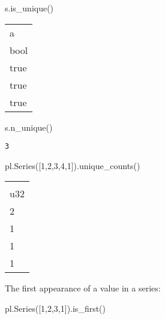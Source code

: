 \documentclass[
  letterpaper,
  DIV=11,
  numbers=noendperiod]{scrartcl}
\newenvironment{Shaded}{\begin{snugshade}}{\end{snugshade}}
\newcommand{\DecValTok}[1]{\textcolor[rgb]{0.68,0.00,0.00}{#1}}
\newcommand{\NormalTok}[1]{\textcolor[rgb]{0.00,0.23,0.31}{#1}}
\begin{document}
\begin{Shaded}
\begin{Highlighting}[]
\NormalTok{s.is\_unique()}
\end{Highlighting}
\end{Shaded}

\begin{longtable}[]{@{}l@{}}
\toprule()
a \\
bool \\
\midrule()
\endhead
true \\
true \\
true \\
\bottomrule()
\end{longtable}

\begin{Shaded}
\begin{Highlighting}[]
\NormalTok{s.n\_unique()}
\end{Highlighting}
\end{Shaded}

\begin{verbatim}
3
\end{verbatim}

\begin{Shaded}
\begin{Highlighting}[]
\NormalTok{pl.Series([}\DecValTok{1}\NormalTok{,}\DecValTok{2}\NormalTok{,}\DecValTok{3}\NormalTok{,}\DecValTok{4}\NormalTok{,}\DecValTok{1}\NormalTok{]).unique\_counts()}
\end{Highlighting}
\end{Shaded}

\begin{longtable}[]{@{}l@{}}
\toprule()
 \\
u32 \\
\midrule()
\endhead
2 \\
1 \\
1 \\
1 \\
\bottomrule()
\end{longtable}

The first appearance of a value in a series:

\begin{Shaded}
\begin{Highlighting}[]
\NormalTok{pl.Series([}\DecValTok{1}\NormalTok{,}\DecValTok{2}\NormalTok{,}\DecValTok{3}\NormalTok{,}\DecValTok{1}\NormalTok{]).is\_first()}
\end{Highlighting}
\end{Shaded}
\end{document}
